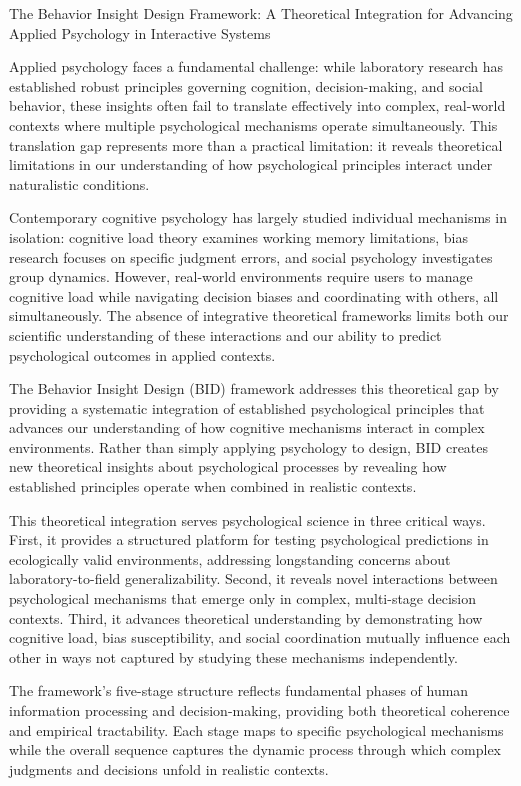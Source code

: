 \documentclass[
  authoryear,
  preprint]{elsarticle}
\begin{document}
The Behavior Insight Design Framework: A Theoretical Integration for
Advancing Applied Psychology in Interactive Systems

Applied psychology faces a fundamental challenge: while laboratory
research has established robust principles governing cognition,
decision-making, and social behavior, these insights often fail to
translate effectively into complex, real-world contexts where multiple
psychological mechanisms operate simultaneously. This translation gap
represents more than a practical limitation: it reveals theoretical
limitations in our understanding of how psychological principles
interact under naturalistic conditions.

Contemporary cognitive psychology has largely studied individual
mechanisms in isolation: cognitive load theory examines working memory
limitations, bias research focuses on specific judgment errors, and
social psychology investigates group dynamics. However, real-world
environments require users to manage cognitive load while navigating
decision biases and coordinating with others, all simultaneously. The
absence of integrative theoretical frameworks limits both our scientific
understanding of these interactions and our ability to predict
psychological outcomes in applied contexts.

The Behavior Insight Design (BID) framework addresses this theoretical
gap by providing a systematic integration of established psychological
principles that advances our understanding of how cognitive mechanisms
interact in complex environments. Rather than simply applying psychology
to design, BID creates new theoretical insights about psychological
processes by revealing how established principles operate when combined
in realistic contexts.

This theoretical integration serves psychological science in three
critical ways. First, it provides a structured platform for testing
psychological predictions in ecologically valid environments, addressing
longstanding concerns about laboratory-to-field generalizability.
Second, it reveals novel interactions between psychological mechanisms
that emerge only in complex, multi-stage decision contexts. Third, it
advances theoretical understanding by demonstrating how cognitive load,
bias susceptibility, and social coordination mutually influence each
other in ways not captured by studying these mechanisms independently.

The framework's five-stage structure reflects fundamental phases of
human information processing and decision-making, providing both
theoretical coherence and empirical tractability. Each stage maps to
specific psychological mechanisms while the overall sequence captures
the dynamic process through which complex judgments and decisions unfold
in realistic contexts.
\end{document}
